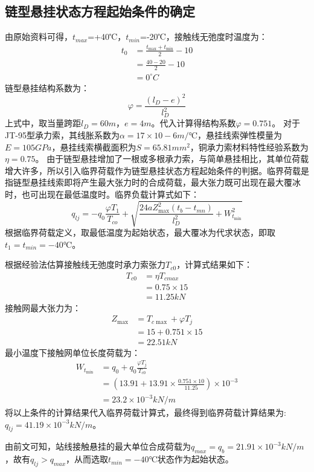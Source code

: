 \subsection{链型悬挂状态方程起始条件的确定}
由原始资料可得，$t_{max}$=+40℃，$t_{min}$=-20℃，接触线无弛度时温度为：
\begin{align*}
	t_0&=\frac{t_{\max}+t_{\min}}{2}-10
	\\
	&=\frac{40-20}{2}-10
	\\
	&=0^{\circ}C
\end{align*}
链型悬挂结构系数为：
$$
\varphi =\frac{(l_D-e)^2}{l_{D}^{2}}
$$
上式中，取当量跨距$l_D=60m$，$e=4m$。代入计算得结构系数$\varphi=0.751$。
对于JT-95型承力索，其线胀系数为$\alpha=17×10-6 m/℃$，悬挂线索弹性模量为$E=105GPa$，悬挂线索横截面积为$S=65.81mm^2$，铜承力索材料特性经验系数为$\eta=0.75$。
由于链型悬挂增加了一根或多根承力索，与简单悬挂相比，其单位荷载增大许多，所以引入临界荷载作为链型悬挂状态方程起始条件的判据。临界荷载是指链型悬挂线索即将产生最大张力时的合成荷载，最大张力既可出现在最大覆冰时，也可出现在最低温度时。临界负载计算式如下：
$$
q_{lj}=-q_0\frac{\varphi T_1}{T_{co}}+\sqrt{\frac{24aZ_{\max}^{2}(t_b-t_{mn})}{l_{D}^{2}}+W_{t_{\min}}^{2}}
$$
根据临界荷载定义，取最低温度为起始状态，最大覆冰为代求状态，即取$t_1=t_{min}=-40℃$。

根据经验法估算接触线无弛度时承力索张力$T_{c0}$，计算式结果如下：
\begin{align*}
	T_{c0}&=\eta T_{cmax}
	\\
	&=0.75\times 15
	\\
	&=11.25kN
\end{align*}
接触网最大张力为：
\begin{align*}
	Z_{\max}&=T_{c\max}+\varphi T_j
	\\
	&=15+0.751\times 15
	\\
	&=22.51kN
\end{align*}
最小温度下接触网单位长度荷载为：
\begin{align*}
	W_{t_{\min}}&=q_0+q_0\frac{\varphi T_j}{T_{c0}}
	\\
	&=\left( 13.91+13.91\times \frac{0.751\times 10}{11.25} \right) \times 10^{-3}
	\\
	&=23.2\times 10^{-3}kN/m
\end{align*}
将以上条件的计算结果代入临界荷载计算式，最终得到临界荷载计算结果为:$q_{lj}=41.19×10^{-3} kN/m$。

由前文可知，站线接触悬挂的最大单位合成荷载为$q_{max}=q_b=21.91×10^{-3}kN/m$ ，故有$q_{lj}>q_{max}$，从而选取$t_{min}=-40℃$状态作为起始状态。

